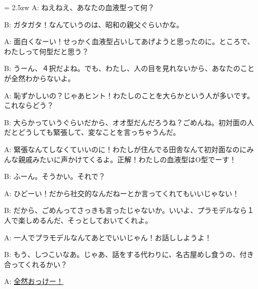 \documentclass[11pt]{amsart}
\title{}
\author{}
\newenvironment{hangall}[1]{\hangindent = 2.5zw\everypar{\hangindent = 2.5zw}}{}
\begin{document}
\maketitle
\begin{hangall}{}%
A: ねえねえ、あなたの血液型って何？

B: ガタガタ！なんていうのは、昭和の親父ぐらいかな。

A: 面白くなーい！せっかく血液型占いしてあげようと思ったのに。ところで、わたしって何型だと思う？

B: うーん、４択だよね。でも、わたし、人の目を見れないから、あなたのことが全然わからないよ。

A: 恥ずかしいの？じゃあヒント！わたしのことを大らかという人が多いです。これならどう？

B: 大らかっていうぐらいだから、オオ型だんだろうね？ごめんね。初対面の人だとどうしても緊張して、変なことを言っちゃうんだ。

A: 緊張なんてしなくていいのに！わたしが住んでる田舎なんて初対面なのにみんな親戚みたいに声かけてくるよ。正解！わたしの血液型はO型でーす！

B: ふーん。そうかい。それで？

A: ひどーい！だから社交的なんだねーとか言ってくれてもいいじゃない！

B: だから、ごめんってさっきも言ったじゃないか。いいよ、プラモデルなら１人で楽しめるんだ、そっとしておいてくれよ。

A: 一人でプラモデルなんてあとでいいじゃん！お話ししようよ！

B: もう、しつこいなあ。じゃあ、話をする代わりに、名古屋めし食うの、付き合ってくれるかい？

A: \ul{全然おっけー！}\end{hangall}
\end{document}
